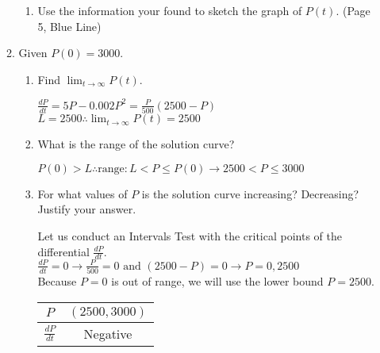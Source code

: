 \documentclass[10pt,letterpaper]{report}
\begin{document}
\begin{enumerate}
\begin{enumerate}
\begin{enumerate}
      \item{Use the information your found to sketch the graph of $P(t)$. (Page 5, Blue Line)}
        
        \pagebreak
        
    \end{enumerate}
    
    \item{Given $P(0)=3000$.}
    \begin{enumerate}
      \item{Find $\lim_{t\to\infty}P(t)$. \\}
      
        $\frac{dP}{dt}=5P-0.002P^{2}=\frac{P}{500}\left(2500-P\right)$ \\
        
        $L=2500\therefore \lim_{t\to\infty}P(t)=2500$ \\
        
      \item{What is the range of the solution curve? \\}
      
        $P(0)>L\therefore \text{range}: L< P\leq P(0)\rightarrow 2500< P\leq 3000$ \\
        
      \item{For what values of $P$ is the solution curve increasing? Decreasing? Justify your answer. \\}
      
        Let us conduct an Intervals Test with the critical points of the differential $\frac{dP}{dt}$. \\
        
        $\frac{dP}{dt}=0\rightarrow \frac{P}{500}=0 \text{ and } \left(2500-P\right)=0\rightarrow P=0, 2500$ \\
        
        Because $P=0$ is out of range, we will use the lower bound $P=2500$. 
        
        \begin{center}
          \begin{tabular}{| c | c |}
            \hline
            $P$ & $(2500, 3000)$ \\
            \hline
            $\frac{dP}{dt}$ & Negative \\
            \hline
          \end{tabular}
        \end{center} \\
        

\end{enumerate}
\end{enumerate}
\end{enumerate}
\end{document}
